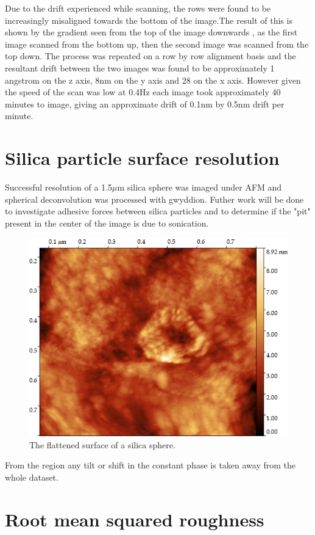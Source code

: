 Due to the drift experienced while scanning, the rows were found to be increasingly misaligned towards the bottom of the image.The result of this is shown by the gradient seen from the top of the image downwards , as the first image scanned from the bottom up, then the second image was scanned from the top down. The process was repeated on a row by row alignment basis and the resultant drift between the two images was found to be approximately 1 angstrom on the z axis, 8nm on the y axis and 28 on the x axis. However given the speed of the scan was low at 0.4Hz each image took approximately 40 minutes to image, giving an approximate drift of 0.1nm by 0.5nm drift per minute.


\section{Silica particle surface resolution} %

Successful resolution of a 1.5$\mu$m silica sphere was imaged under AFM and spherical deconvolution was processed with gwyddion. \cite{gwy} Futher work will be done to investigate adhesive forces between silica particles and to determine if the "pit" present in the center of the image is due to sonication.

\begin{figure}[h]     %
        \begin{center}
          \includegraphics[width=130mm]{chapter4/Sili2.png}
\end{center}
\caption{The flattened surface of a silica sphere.}
\label{fig:Sili2}                 %
\end{figure}


From the region any tilt or shift in the constant phase is taken away from the whole dataset. %

\newpage
\newpage
\newpage

\section{Root mean squared roughness}
\newpage